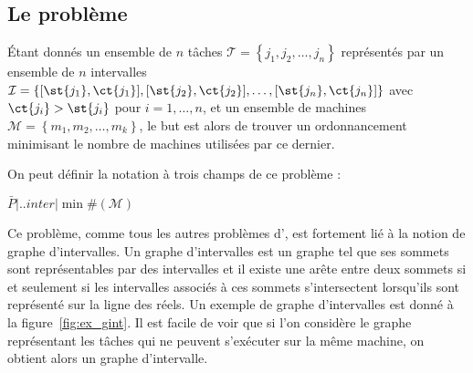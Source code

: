 \documentclass[a4paper,11pt]{article}
\begin{document}
\subsection{Le problème \bisched}

Étant donnés un ensemble de $n$ tâches $\mathcal{T} = \left\{
j_1, j_2, \dots, j_n \right\}$ représentés par un ensemble de $n$ intervalles $\mathcal{I} = \{
[ \st{j_1}, \ct{j_1} ], [ \st{j_2}, \ct{j_2} ], \dots, [ \st{j_n},
\ct{j_n} ] \}$ avec $\ct{j_i} > \st{j_i}$ pour $i = 1, \dots, n$, et un ensemble de
machines $\mathcal{M} = \left\{ m_1, m_2, \dots, m_k \right\}$, le but est alors de trouver un
ordonnancement minimisant le nombre de machines utilisées par ce dernier.

On peut définir la notation à trois champs de ce problème :
\begin{center}
    $\bar{P} \Big| . . inter \Big| \min \#(\mathcal{M})$
\end{center}

Ce problème, comme tous les autres problèmes d'\isched, est fortement lié à la notion de graphe
d'intervalles. Un graphe d'intervalles est un graphe tel que ses sommets sont représentables par
des intervalles et il existe une arête entre deux sommets si et seulement si les intervalles
associés à ces sommets s'intersectent lorsqu'ils sont représenté sur la ligne des réels. Un exemple
de graphe d'intervalles est donné à la
figure~\ref{fig:ex_gint}. Il est facile de voir que si l'on considère le graphe représentant les
tâches qui ne peuvent s'exécuter sur la même machine, on obtient alors un graphe d'intervalle.
\end{document}
